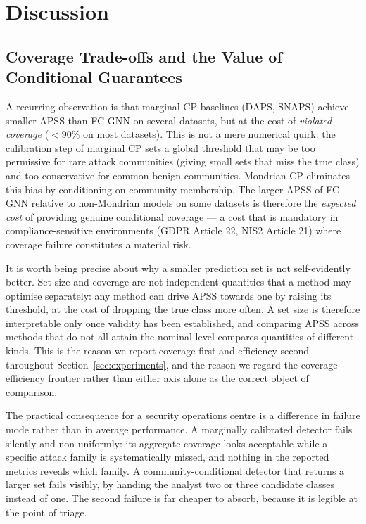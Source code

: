 \section{Discussion}
\label{sec:discussion}

\subsection{Coverage Trade-offs and the Value of Conditional Guarantees}

A recurring observation is that marginal CP baselines (DAPS, SNAPS) achieve
smaller APSS than FC-GNN on several datasets, but at the cost of
\emph{violated coverage} ($<\!90\%$ on most datasets).
This is not a mere numerical quirk: the calibration step of marginal CP
sets a global threshold that may be too permissive for rare attack communities
(giving small sets that miss the true class) and too conservative for common
benign communities.
Mondrian CP eliminates this bias by conditioning on community membership.
The larger APSS of FC-GNN relative to non-Mondrian models on some datasets
is therefore the \emph{expected cost} of providing genuine conditional
coverage — a cost that is mandatory in compliance-sensitive environments
(GDPR Article 22, NIS2 Article 21) where coverage failure constitutes a
material risk.

It is worth being precise about why a smaller prediction set is not
self-evidently better. Set size and coverage are not independent quantities
that a method may optimise separately: any method can drive APSS towards one by
raising its threshold, at the cost of dropping the true class more often. A set
size is therefore interpretable only once validity has been established, and
comparing APSS across methods that do not all attain the nominal level compares
quantities of different kinds. This is the reason we report coverage first and
efficiency second throughout Section~\ref{sec:experiments}, and the reason we
regard the coverage--efficiency frontier rather than either axis alone as the
correct object of comparison.

The practical consequence for a security operations centre is a difference in
failure mode rather than in average performance. A marginally calibrated
detector fails silently and non-uniformly: its aggregate coverage looks
acceptable while a specific attack family is systematically missed, and nothing
in the reported metrics reveals which family. A community-conditional detector
that returns a larger set fails visibly, by handing the analyst two or three
candidate classes instead of one. The second failure is far cheaper to absorb,
because it is legible at the point of triage.


